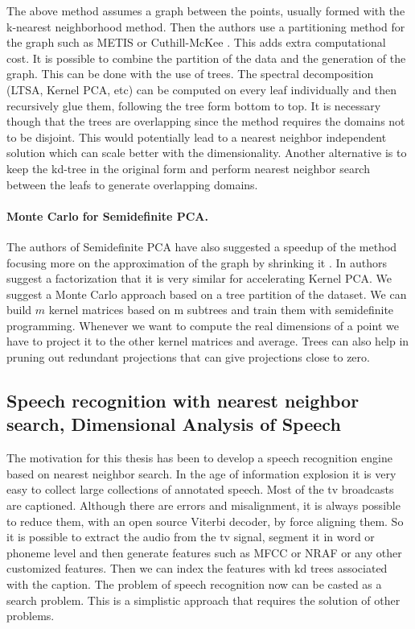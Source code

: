 \documentclass[12pt,letterpaper,doublespaced,ETD,dvips,proposal]{gtthesis}
\begin{document}
\begin{Body}
\vspace{1cm}

The above method assumes a graph between the points, usually formed with the k-nearest neighborhood
method. Then the authors use a partitioning method for the graph such as METIS \cite{karypis1995mug}
or Cuthill-McKee \cite{george1981csl}.
This adds extra computational cost. It is possible to combine the 
partition of the data and the generation of the graph. This can be done with the use of trees. 
The spectral decomposition (LTSA, Kernel PCA, etc) can be computed on every leaf individually 
and then recursively glue them, following the tree form bottom to top. It is necessary though that
the trees are overlapping since the method requires the domains not to be disjoint. This would potentially
lead to a nearest neighbor independent solution which can scale better with the dimensionality. 
Another alternative is to keep the kd-tree in the original form and perform nearest 
neighbor search between the leafs to generate overlapping domains.

\paragraph{Monte Carlo for Semidefinite PCA.}
The authors of Semidefinite PCA have also suggested a speedup of the method focusing more on the
approximation of the graph by shrinking it \cite{weinberger2005ndr}. In \cite{scholkopf2002lks} 
authors suggest a factorization that it is very similar for accelerating Kernel PCA. We suggest a
Monte Carlo approach based on a tree partition of the dataset. We can build $m$ kernel matrices
based on m subtrees and train them with semidefinite programming. Whenever we want to compute the 
real dimensions of a point we have to project it to the other kernel matrices and average. Trees
can also help in pruning out redundant projections that can give projections close to zero.


\subsection{Speech recognition with nearest neighbor search, Dimensional Analysis of Speech}
The  motivation for this thesis has been to develop a speech recognition engine based on nearest neighbor search. In the age of information explosion it is very easy to collect large collections of annotated speech. Most of the tv broadcasts are captioned. Although there are errors and misalignment, it is always possible to reduce them, with an open source Viterbi decoder, by force aligning them. So it is possible to extract the audio from the tv signal, segment it in word or phoneme level and then generate features such as MFCC or NRAF or any other customized features. Then we can index the features with kd trees associated with the caption. The problem of speech recognition now can be casted as a search problem. This is a simplistic approach that requires the solution of other problems.


\end{Body}
\end{document}

